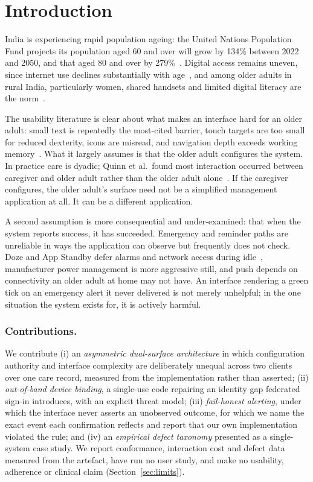 \documentclass[runningheads,a4paper]{llncs}
\begin{document}
\section{Introduction}

India is experiencing rapid population ageing: the United Nations Population Fund projects
its population aged 60 and over will grow by 134\% between 2022 and 2050, and that aged 80
and over by 279\%~\cite{unfpa}. Digital access remains uneven, since internet use declines
substantially with age~\cite{dfi}, and among older adults in rural India, particularly
women, shared handsets and limited digital literacy are the norm~\cite{chakraborty,khare}.

The usability literature is clear about what makes an interface hard for an older adult:
small text is repeatedly the most-cited barrier, touch targets are too small for reduced
dexterity, icons are misread, and navigation depth exceeds working
memory~\cite{awan,elguera,liu}. What it largely assumes is that the older adult configures
the system. In practice care is dyadic; Quinn et al.\ found most interaction occurred
between caregiver and older adult rather than the older adult alone~\cite{quinn}. If the
caregiver configures, the older adult's surface need not be a simplified management
application at all. It can be a different application.

A second assumption is more consequential and under-examined: that when the system reports
success, it has succeeded. Emergency and reminder paths are unreliable in ways the
application can observe but frequently does not check. Doze and App Standby defer alarms
and network access during idle~\cite{doze}, manufacturer power management is more aggressive
still, and push depends on connectivity an older adult at home may not have. An interface
rendering a green tick on an emergency alert it never delivered is not merely unhelpful; in
the one situation the system exists for, it is actively harmful.

\subsubsection{Contributions.} We contribute (i) an \emph{asymmetric dual-surface
architecture} in which configuration authority and interface complexity are deliberately
unequal across two clients over one care record, measured from the implementation rather
than asserted; (ii) \emph{out-of-band device binding}, a single-use code repairing an
identity gap federated sign-in introduces, with an explicit threat model; (iii)
\emph{fail-honest alerting}, under which the interface never asserts an unobserved outcome,
for which we name the exact event each confirmation reflects and report that our own
implementation violated the rule; and (iv) an \emph{empirical defect taxonomy} presented as
a single-system case study. We report conformance, interaction cost and defect data measured
from the artefact, have run no user study, and make no usability, adherence or clinical
claim (Section~\ref{sec:limits}).
\end{document}

